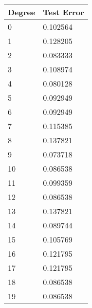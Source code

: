 \documentclass[
]{article}
\author{}
\date{}
\begin{document}
\begin{longtable}[]{@{}ll@{}}
\toprule
Degree & Test Error\tabularnewline
\midrule
\endhead
0 & 0.102564\tabularnewline
1 & 0.128205\tabularnewline
2 & 0.083333\tabularnewline
3 & 0.108974\tabularnewline
4 & 0.080128\tabularnewline
5 & 0.092949\tabularnewline
6 & 0.092949\tabularnewline
7 & 0.115385\tabularnewline
8 & 0.137821\tabularnewline
9 & 0.073718\tabularnewline
10 & 0.086538\tabularnewline
11 & 0.099359\tabularnewline
12 & 0.086538\tabularnewline
13 & 0.137821\tabularnewline
14 & 0.089744\tabularnewline
15 & 0.105769\tabularnewline
16 & 0.121795\tabularnewline
17 & 0.121795\tabularnewline
18 & 0.086538\tabularnewline
19 & 0.086538\tabularnewline
\bottomrule
\end{longtable}
\end{document}
